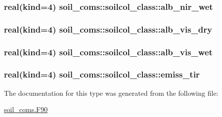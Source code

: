 \subsubsection[{\texorpdfstring{alb\+\_\+nir\+\_\+wet}{alb_nir_wet}}]{\setlength{\rightskip}{0pt plus 5cm}real(kind=4) soil\+\_\+coms\+::soilcol\+\_\+class\+::alb\+\_\+nir\+\_\+wet}\hypertarget{structsoil__coms_1_1soilcol__class_aafaed831a367d9dfa55f84402cbcc119}{}\label{structsoil__coms_1_1soilcol__class_aafaed831a367d9dfa55f84402cbcc119}
\subsubsection[{\texorpdfstring{alb\+\_\+vis\+\_\+dry}{alb_vis_dry}}]{\setlength{\rightskip}{0pt plus 5cm}real(kind=4) soil\+\_\+coms\+::soilcol\+\_\+class\+::alb\+\_\+vis\+\_\+dry}\hypertarget{structsoil__coms_1_1soilcol__class_a26fb51ecc2f4d51c9dcffaf003a91f2a}{}\label{structsoil__coms_1_1soilcol__class_a26fb51ecc2f4d51c9dcffaf003a91f2a}
\subsubsection[{\texorpdfstring{alb\+\_\+vis\+\_\+wet}{alb_vis_wet}}]{\setlength{\rightskip}{0pt plus 5cm}real(kind=4) soil\+\_\+coms\+::soilcol\+\_\+class\+::alb\+\_\+vis\+\_\+wet}\hypertarget{structsoil__coms_1_1soilcol__class_a38d9b036b4fca3d4b3c23d5a19a4e7df}{}\label{structsoil__coms_1_1soilcol__class_a38d9b036b4fca3d4b3c23d5a19a4e7df}
\subsubsection[{\texorpdfstring{emiss\+\_\+tir}{emiss_tir}}]{\setlength{\rightskip}{0pt plus 5cm}real(kind=4) soil\+\_\+coms\+::soilcol\+\_\+class\+::emiss\+\_\+tir}\hypertarget{structsoil__coms_1_1soilcol__class_a62a2febe4a46fb016a2ddaf87f24621f}{}\label{structsoil__coms_1_1soilcol__class_a62a2febe4a46fb016a2ddaf87f24621f}


The documentation for this type was generated from the following file\+:\begin{DoxyCompactItemize}
\item 
\hyperlink{soil__coms_8_f90}{soil\+\_\+coms.\+F90}\end{DoxyCompactItemize}
